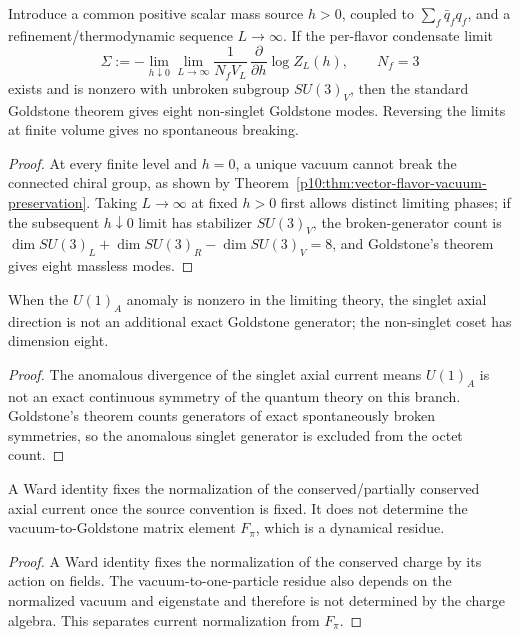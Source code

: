 \documentclass[12pt,a4paper]{article}
\begin{document}
\begin{theorem}
\label{p10:thm:conditional-goldstone-package}
Introduce a common positive scalar mass source \(h>0\), coupled to \(\sum_f\bar q_fq_f\), and a refinement/thermodynamic sequence \(L\to\infty\).  If the per-flavor condensate limit
\begin{equation}
\Sigma:=-\lim_{h\downarrow0}\lim_{L\to\infty}\frac{1}{N_fV_L}\,\frac{\partial}{\partial h}\log Z_L(h),\qquad N_f=3
\end{equation}
exists and is nonzero with unbroken subgroup \(SU(3)_V\), then the standard Goldstone theorem gives eight non-singlet Goldstone modes.  Reversing the limits at finite volume gives no spontaneous breaking.
\end{theorem}
\begin{proof}
At every finite level and $h=0$, a unique vacuum cannot break the connected chiral group, as shown by Theorem~\ref{p10:thm:vector-flavor-vacuum-preservation}.  Taking $L\to\infty$ at fixed $h>0$ first allows distinct limiting phases; if the subsequent $h\downarrow0$ limit has stabilizer $SU(3)_V$, the broken-generator count is $\dim SU(3)_L+\dim SU(3)_R-\dim SU(3)_V=8$, and Goldstone's theorem gives eight massless modes.
\end{proof}

\begin{theorem}
\label{p10:thm:axial-singlet-goldstone-exclusion}
When the \(U(1)_A\) anomaly is nonzero in the limiting theory, the singlet axial direction is not an additional exact Goldstone generator; the non-singlet coset has dimension eight.
\end{theorem}
\begin{proof}
The anomalous divergence of the singlet axial current means $U(1)_A$ is not an exact continuous symmetry of the quantum theory on this branch.  Goldstone's theorem counts generators of exact spontaneously broken symmetries, so the anomalous singlet generator is excluded from the octet count.
\end{proof}

\begin{theorem}
\label{p10:thm:no-residual-goldstone-current-renormalization}
A Ward identity fixes the normalization of the conserved/partially conserved axial current once the source convention is fixed.  It does not determine the vacuum-to-Goldstone matrix element \(F_\pi\), which is a dynamical residue.
\end{theorem}
\begin{proof}
A Ward identity fixes the normalization of the conserved charge by its action on fields.  The vacuum-to-one-particle residue also depends on the normalized vacuum and eigenstate and therefore is not determined by the charge algebra.  This separates current normalization from $F_\pi$.
\end{proof}
\end{document}
